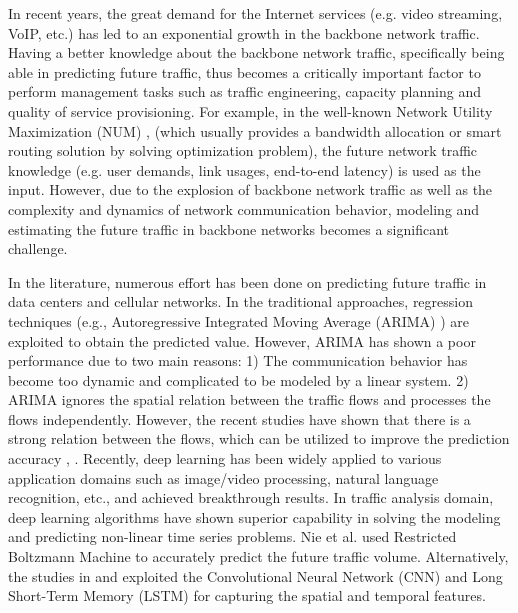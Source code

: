In recent years, the great demand for the Internet services (e.g. video streaming, VoIP, etc.) has led to an exponential growth in the backbone network traffic. 
Having a better knowledge about the backbone network traffic, specifically being able in predicting future traffic, thus becomes a critically important factor to perform management tasks such as traffic engineering, capacity planning and quality of service provisioning. 
For example, in the well-known Network Utility Maximization (NUM) \cite{xu2018experience}, \cite{low1999optimization} (which usually provides a bandwidth allocation or smart routing solution by solving optimization problem), the future network traffic knowledge (e.g. user demands, link usages, end-to-end latency) is used as the input. 
However, due to the explosion of backbone network traffic as well as the complexity and dynamics of network communication behavior, modeling and estimating the future traffic in backbone networks becomes a significant challenge.

In the literature, numerous effort has been done on predicting future traffic in data centers and cellular networks.
In the traditional approaches, regression techniques (e.g., Autoregressive Integrated Moving Average (ARIMA) \cite{box2015time}) are exploited to obtain the predicted value. However, ARIMA has shown a poor performance due to two main reasons: 1) The communication behavior has become too dynamic and complicated to be modeled by a linear system. 2) ARIMA ignores the spatial relation between the traffic flows and processes the flows independently. However, the recent studies have shown that there is a strong relation between the flows, which can be utilized to improve the prediction accuracy \cite{wang2017spatiotemporal}, \cite{xie2016accurate}. 
Recently, deep learning has been widely applied to various application domains such as image/video processing, natural language recognition, etc., and achieved breakthrough results. 
In traffic analysis domain, deep learning algorithms have shown superior capability in solving the modeling and predicting non-linear time series problems. Nie et al. \cite{nie2016traffic} used Restricted Boltzmann Machine to accurately predict the future traffic volume.
Alternatively, the studies in \cite{wang2017spatiotemporal} and \cite{cao2018interactive} exploited the Convolutional Neural Network (CNN) and Long Short-Term Memory (LSTM) for capturing the spatial and temporal features. 

